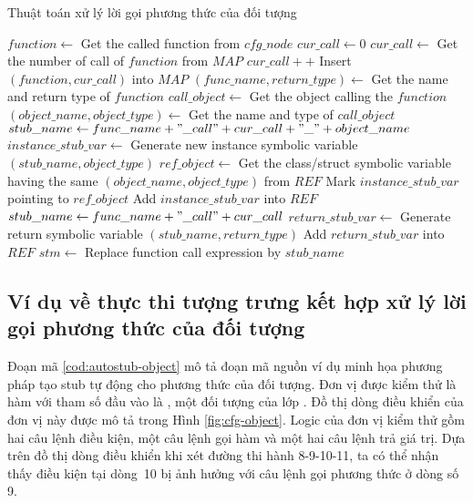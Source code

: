 \begin{algorithm}[H]
    \small
    \caption{Thuật toán xử lý lời gọi phương thức của đối tượng}
    \label{alg:autostub-object}
    $function \leftarrow$ Get the called function from $cfg\_node$\;
    $cur\_call \leftarrow 0$\;
     {
        $cur\_call \leftarrow $ Get the number of call of $function$ from $MAP$\; 
    }
    $cur\_call++$\;
    Insert $(function, cur\_call)$ into $MAP$\;
    $(func\_name, return\_type) \leftarrow$ Get the name and return type of $function$\;
    $call\_object \leftarrow$ Get the object calling the $function$\;
     {
        $(object\_name, object\_type) \leftarrow$ Get the name and type of $call\_object$\;
        $stub\_name \leftarrow func\_name + "\_call" + cur\_call + "\_" + object\_name$\;
        $instance\_stub\_var \leftarrow$ Generate new instance symbolic variable $(stub\_name, object\_type)$\;
        $ref\_object \leftarrow$ Get the class/struct symbolic variable having the same $(object\_name, object\_type)$ from $REF$\;
        Mark $instance\_stub\_var$ pointing to $ref\_object$\;
        Add $instance\_stub\_var$ into $REF$\;
    }
     {
        $stub\_name \leftarrow func\_name + "\_call" + cur\_call$\;
        $return\_stub\_var \leftarrow$ Generate return symbolic variable $(stub\_name, return\_type)$\;
        Add $return\_stub\_var$ into $REF$\;
        $stm \leftarrow$ Replace function call expression by $stub\_name$\;
    }
\end{algorithm}

\subsection{Ví dụ về thực thi tượng trưng kết hợp xử lý lời gọi phương thức của đối tượng}
Đoạn mã \autoref{cod:autostub-object} mô tả đoạn mã nguồn ví dụ minh họa phương pháp tạo stub tự động cho phương thức của đối tượng. Đơn vị được kiểm thử là hàm  với tham số đầu vào là , một đối tượng của lớp . Đồ thị dòng điều khiển của đơn vị này được mô tả trong Hình \autoref{fig:cfg-object}. Logic của đơn vị kiểm thử gồm hai câu lệnh điều kiện, một câu lệnh gọi hàm và một hai câu lệnh trả giá trị. Dựa trên đồ thị dòng điều khiển khi xét đường thi hành 8-9-10-11, ta có thể nhận thấy điều kiện  tại dòng~10 bị ảnh hưởng với câu lệnh gọi phương thức ở dòng số 9. 

